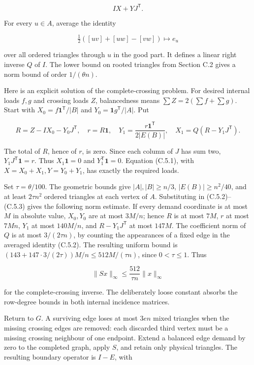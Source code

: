 \documentclass[english,11pt,a4paper]{article}
\begin{document}
\[IX+YJ^{\mathsf T}.
\tag{C.5.1}\]

For every \(u\in A\), average the identity

\[\tfrac12([uv]+[uw]-[vw])\longmapsto e_u
\tag{C.5.2}\]

over all ordered triangles through \(u\) in the good part. It defines a linear right inverse \(Q\) of \(I\). The lower bound on rooted triangles from Section C.2 gives a norm bound of order \(1/(\theta n)\).

Here is an explicit solution of the complete-crossing problem. For desired internal loads \(f,g\) and crossing loads \(Z\), balancedness means \(\sum Z=2(\sum f+\sum g)\). Start with \(X_0=f\mathbf1^{\mathsf T}/|B|\) and \(Y_0=\mathbf1g^{\mathsf T}/|A|\). Put

\[R=Z-IX_0-Y_0J^{\mathsf T},\quad r=R\mathbf1,\quad
Y_1=\frac{r\mathbf1^{\mathsf T}}{2|E(B)|},\quad
X_1=Q(R-Y_1J^{\mathsf T}).
\tag{C.5.3}\]

The total of \(R\), hence of \(r\), is zero. Since each column of \(J\) has sum two, \(Y_1J^{\mathsf T}\mathbf1=r\). Thus \(X_1\mathbf1=0\) and \(Y_1^{\mathsf T}\mathbf1=0\). Equation (C.5.1), with \(X=X_0+X_1,Y=Y_0+Y_1\), has exactly the required loads.

Set \(\tau=\theta/100\). The geometric bounds give \(|A|,|B|\ge n/3\), \(|E(B)|\ge n^2/40\), and at least \(2\tau n^2\) ordered triangles at each vertex of \(A\). Substituting in (C.5.2)--(C.5.3) gives the following norm estimate. If every demand coordinate is at most \(M\) in absolute value, \(X_0,Y_0\) are at most \(3M/n\); hence \(R\) is at most \(7M\), \(r\) at most \(7Mn\), \(Y_1\) at most \(140M/n\), and \(R-Y_1J^{\mathsf T}\) at most \(147M\). The coefficient norm of \(Q\) is at most \(3/(2\tau n)\), by counting the appearances of a fixed edge in the averaged identity (C.5.2). The resulting uniform bound is \((143+147\cdot3/(2\tau))M/n\le512M/(\tau n)\), since \(0<\tau\le1\). Thus

\[\|Sx\|_\infty\le\frac{512}{\tau n}\|x\|_\infty
\tag{C.5.4}\]

for the complete-crossing inverse. The deliberately loose constant absorbs the row-degree bounds in both internal incidence matrices.

Return to \(G\). A surviving edge loses at most \(3en\) mixed triangles when the missing crossing edges are removed: each discarded third vertex must be a missing crossing neighbour of one endpoint. Extend a balanced edge demand by zero to the completed graph, apply \(S\), and retain only physical triangles. The resulting boundary operator is \(I-E\), with
\end{document}
